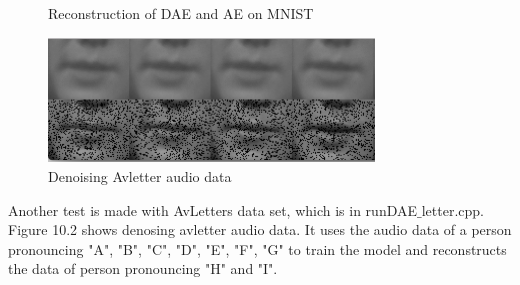 \documentclass[12pt]{article}
\begin{document}
\begin{figure}[!t]
\centering
{}
\caption{Reconstruction of DAE and AE on MNIST}
\label{fig5}
\end{figure}

\begin{figure}[h]
\centering
\includegraphics[height=1.3in]{avletterRec.png}
\caption{Denoising Avletter audio data} \label{fig:side:a}
\end{figure}
Another test is made with AvLetters data set, which is in runDAE$\_$letter.cpp. Figure 10.2 shows denosing avletter audio data. It uses the audio data of a person pronouncing "A", "B", "C", "D", "E", "F", "G" to train the model and reconstructs the data of person pronouncing "H" and "I".
\end{document}
